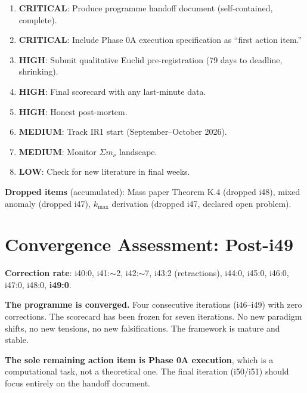 \documentclass[11pt,a4paper]{article}
\begin{document}
\begin{enumerate}
\item \textbf{CRITICAL}: Produce programme handoff document (self-contained, complete).
\item \textbf{CRITICAL}: Include Phase 0A execution specification as ``first action item.''
\item \textbf{HIGH}: Submit qualitative Euclid pre-registration (79 days to deadline, shrinking).
\item \textbf{HIGH}: Final scorecard with any last-minute data.
\item \textbf{HIGH}: Honest post-mortem.
\item \textbf{MEDIUM}: Track IR1 start (September--October 2026).
\item \textbf{MEDIUM}: Monitor $\Sigma m_\nu$ landscape.
\item \textbf{LOW}: Check for new literature in final weeks.
\end{enumerate}

\textbf{Dropped items} (accumulated): Mass paper Theorem K.4 (dropped i48), mixed anomaly (dropped i47), $k_{\max}$ derivation (dropped i47, declared open problem).


\part{Convergence Assessment: Post-i49}

\begin{tcolorbox}[colback=green!5!white, colframe=green!60!black,
  title={Convergence: CONVERGED}]

\textbf{Correction rate}: i40:0, i41:$\sim$2, i42:$\sim$7, i43:2 (retractions), i44:0, i45:0, i46:0, i47:0, i48:0, \textbf{i49:0}.

\textbf{The programme is converged.} Four consecutive iterations (i46--i49) with zero corrections. The scorecard has been frozen for seven iterations. No new paradigm shifts, no new tensions, no new falsifications. The framework is mature and stable.

\textbf{The sole remaining action item is Phase 0A execution}, which is a computational task, not a theoretical one. The final iteration (i50/i51) should focus entirely on the handoff document.
\end{tcolorbox}
\end{document}
